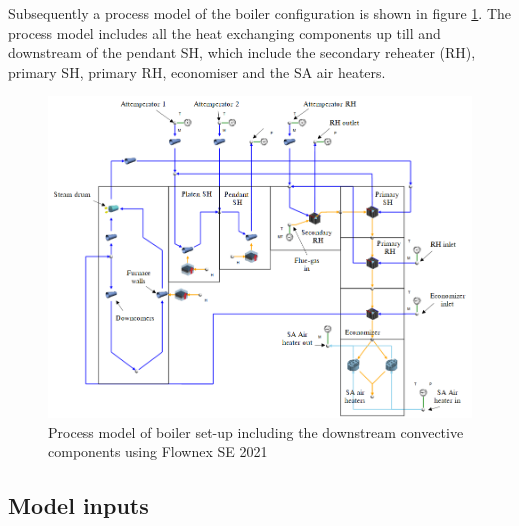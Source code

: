 \documentclass[review]{elsarticle}
\begin{document}
Subsequently a process model of the boiler configuration is shown in figure \ref{fig_flownex}. The process model includes all the heat exchanging components up till and downstream of the pendant SH, which include the secondary reheater (RH), primary SH, primary RH, economiser and the SA air heaters.  
\begin{figure}[h!]
\centering
\includegraphics[scale=0.5]{FLOWNEX_SETUP}
\caption{Process model of boiler set-up including the downstream convective components using Flownex SE 2021}
\label{fig_flownex}
\end{figure}

\subsection{Model inputs}
\end{document}
